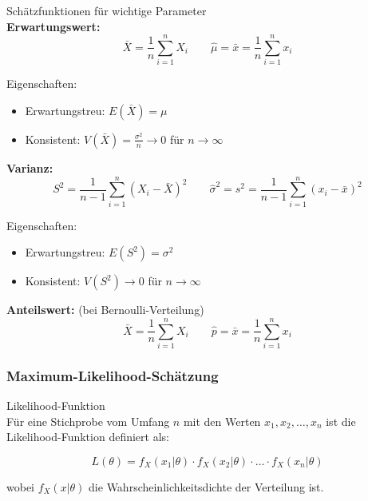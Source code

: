 \begin{theorem}{Schätzfunktionen für wichtige Parameter}\\
\textbf{Erwartungswert:}
\[\bar{X} = \frac{1}{n}\sum_{i=1}^n X_i \qquad \hat{\mu} = \bar{x} = \frac{1}{n}\sum_{i=1}^n x_i\]

Eigenschaften:
\begin{itemize}
  \item Erwartungstreu: $E(\bar{X}) = \mu$
  \item Konsistent: $V(\bar{X}) = \frac{\sigma^2}{n} \to 0$ für $n \to \infty$
\end{itemize}

\textbf{Varianz:}
\[S^2 = \frac{1}{n-1}\sum_{i=1}^n (X_i-\bar{X})^2 \qquad \hat{\sigma}^2 = s^2 = \frac{1}{n-1}\sum_{i=1}^n (x_i-\bar{x})^2\]

Eigenschaften:
\begin{itemize}
  \item Erwartungstreu: $E(S^2) = \sigma^2$
  \item Konsistent: $V(S^2) \to 0$ für $n \to \infty$
\end{itemize}

\textbf{Anteilswert:} (bei Bernoulli-Verteilung)
\[\bar{X} = \frac{1}{n}\sum_{i=1}^n X_i \qquad \hat{p} = \bar{x} = \frac{1}{n}\sum_{i=1}^n x_i\]
\end{theorem}

\subsubsection{Maximum-Likelihood-Schätzung}

\begin{definition}{Likelihood-Funktion}\\
Für eine Stichprobe vom Umfang $n$ mit den Werten $x_1,x_2,\ldots,x_n$ ist die Likelihood-Funktion definiert als:

\[L(\theta) = f_X(x_1|\theta) \cdot f_X(x_2|\theta) \cdot \ldots \cdot f_X(x_n|\theta)\]

wobei $f_X(x|\theta)$ die Wahrscheinlichkeitsdichte der Verteilung ist.
\end{definition}

